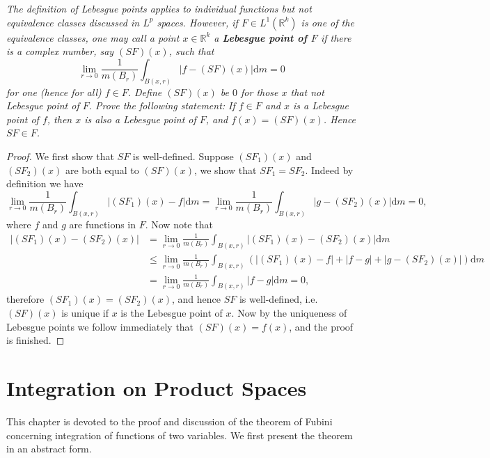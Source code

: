 \begin{problem}\em
The definition of Lebesgue points applies to individual functions but not equivalence classes discussed in $L^p$ spaces. However, if $F\in L^1(\mathbb{R}^k)$ is one of the equivalence classes, one may call a point $x\in\mathbb{R}^k$ a \textbf{Lebesgue point of $F$} if there is a complex number, say $(SF)(x)$, such that 
$$
\lim_{r\rightarrow 0} \frac{1}{m\left( B_r \right)}\int_{B\left( x,r \right)}{\left| f-\left( SF \right) \left( x \right) \right|\mathrm{d}m}=0
$$
for one (hence for all) $f\in F$. Define $(SF)(x)$ be $0$ for those $x$ that not Lebesgue point of $F$. Prove the following statement: If $f\in F$ and $x$ is a Lebesgue point of $f$, then $x$ is also a Lebesgue point of $F$, and $f(x)=(SF)(x)$. Hence $SF\in F$.
\end{problem}
\begin{proof}
We first show that $SF$ is well-defined. Suppose $(SF_1)(x)$ and $(SF_2)(x)$ are both equal to $(SF)(x)$, we show that $SF_1=SF_2$. Indeed by definition we have 
$$
\lim_{r\rightarrow 0} \frac{1}{m\left( B_r \right)}\int_{B\left( x,r \right)}{\left| \left( SF_1 \right) \left( x \right) -f \right|\mathrm{d}m}=\lim_{r\rightarrow 0} \frac{1}{m\left( B_r \right)}\int_{B\left( x,r \right)}{\left| g-\left( SF_2 \right) \left( x \right) \right|\mathrm{d}m}=0,
$$
where $f$ and $g$ are functions in $F$. Now note that 
$$
\begin{aligned}
\left| \left( SF_1 \right) \left( x \right) -\left( SF_2 \right) \left( x \right) \right|&=\lim_{r\rightarrow 0} \frac{1}{m\left( B_r \right)}\int_{B\left( x,r \right)}{\left| \left( SF_1 \right) \left( x \right) -\left( SF_2 \right) \left( x \right) \right|\mathrm{d}m}
\\
&\le \lim_{r\rightarrow 0} \frac{1}{m\left( B_r \right)}\int_{B\left( x,r \right)}{\left( \left| \left( SF_1 \right) \left( x \right) -f \right|+\left| f-g \right|+\left| g-\left( SF_2 \right) \left( x \right) \right| \right) \mathrm{d}m}
\\
&=\lim_{r\rightarrow 0} \frac{1}{m\left( B_r \right)}\int_{B\left( x,r \right)}{\left| f-g \right|\mathrm{d}m}=0,
\end{aligned}
$$
therefore $(SF_1)(x)=(SF_2)(x)$, and hence $SF$ is well-defined, i.e. $(SF)(x)$ is unique if $x$ is the Lebesgue point of $x$. Now by the uniqueness of Lebesgue points we follow immediately that $(SF)(x)=f(x)$, and the proof is finished.
\end{proof}
\newpage
\section{Integration on Product Spaces}
This chapter is devoted to the proof and discussion of the theorem of Fubini concerning integration of functions of two variables. We first present the theorem in an abstract form.
